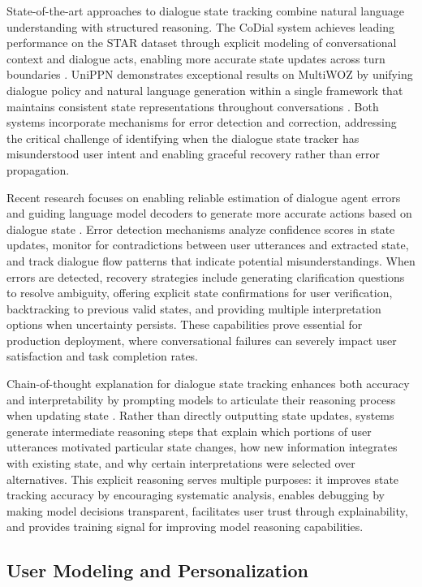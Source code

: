 State-of-the-art approaches to dialogue state tracking combine natural language understanding with structured reasoning. The CoDial system achieves leading performance on the STAR dataset through explicit modeling of conversational context and dialogue acts, enabling more accurate state updates across turn boundaries \citep{kim2024codial}. UniPPN demonstrates exceptional results on MultiWOZ by unifying dialogue policy and natural language generation within a single framework that maintains consistent state representations throughout conversations \citep{he2024unippn}. Both systems incorporate mechanisms for error detection and correction, addressing the critical challenge of identifying when the dialogue state tracker has misunderstood user intent and enabling graceful recovery rather than error propagation.

Recent research focuses on enabling reliable estimation of dialogue agent errors and guiding language model decoders to generate more accurate actions based on dialogue state \citep{zhao2025error}. Error detection mechanisms analyze confidence scores in state updates, monitor for contradictions between user utterances and extracted state, and track dialogue flow patterns that indicate potential misunderstandings. When errors are detected, recovery strategies include generating clarification questions to resolve ambiguity, offering explicit state confirmations for user verification, backtracking to previous valid states, and providing multiple interpretation options when uncertainty persists. These capabilities prove essential for production deployment, where conversational failures can severely impact user satisfaction and task completion rates.

Chain-of-thought explanation for dialogue state tracking enhances both accuracy and interpretability by prompting models to articulate their reasoning process when updating state \citep{li2024chain}. Rather than directly outputting state updates, systems generate intermediate reasoning steps that explain which portions of user utterances motivated particular state changes, how new information integrates with existing state, and why certain interpretations were selected over alternatives. This explicit reasoning serves multiple purposes: it improves state tracking accuracy by encouraging systematic analysis, enables debugging by making model decisions transparent, facilitates user trust through explainability, and provides training signal for improving model reasoning capabilities.

\subsection{User Modeling and Personalization}


